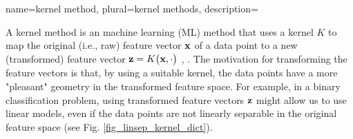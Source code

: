 {
{name={kernel method}, 
plural={kernel methods}, 
	description={A kernel method is an machine learning (ML) method that uses a 
		kernel $K$ to map the original (i.e., raw) feature vector ${\bf x}$ of a 
		data point to a new (transformed) feature vector ${\bf z} = K\big({\bf x},\cdot\big)$ \cite{LearningKernelsBook}, \cite{LampertNowKernel}.
		The motivation for transforming the feature vectors is that, by using a suitable kernel, 
		the data points have a more "pleasant" geometry in the transformed feature space. 
		For example, in a binary classification problem, using transformed feature vectors ${\bf z}$ might 
		allow us to use linear models, even if the data points are not linearly 
		separable in the original feature space (see Fig. \ref{fig_linsep_kernel_dict}). 
\begin{figure}[H]
\begin{center}
\end{center}
\end{figure}}}}
